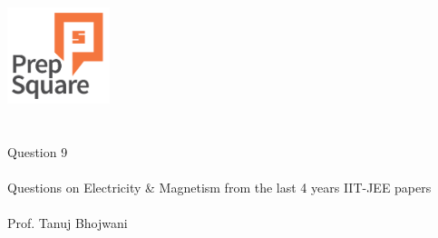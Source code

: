 \documentclass{beamer}
\begin{document}
\begin{center}
\ \\ \ \\
\includegraphics[width=30mm]{Logo-final.png} \\
\ \\ \ \\ 
{\huge Question 9 \\ \ \\ }
{\Large
Questions on Electricity \& Magnetism from the last 4 years IIT-JEE papers
}
{\large \ \\ \ \\ Prof. Tanuj Bhojwani }
\end{center}
\end{document}
